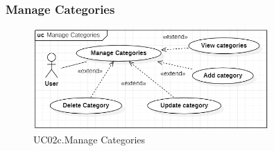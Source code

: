 \documentclass[../thesis.tex]{subfiles}
\begin{document}
\subsubsection{Manage Categories}
\begin{figure}[H]
    \centering
    \includegraphics[width=0.8\textwidth]{images/UCD_ManageCategories.png}
    \caption{UC02c.Manage Categories}
    \label{fig:UCD_manage-categories}
\end{figure}
\end{document}
